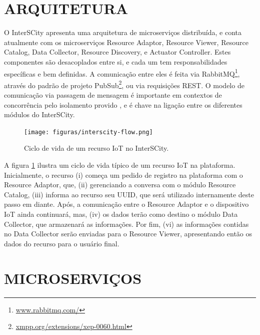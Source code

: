 \section{ARQUITETURA}

O InterSCity apresenta uma arquitetura de microserviços distribuída, e conta
atualmente com os microserviços Resource Adaptor, Resource Viewer,
Resource Catalog, Data Collector, Resource Discovery, e Actuator Controller.
Estes componentes são desacoplados entre si, e cada um tem
responsabilidades específicas e bem definidas. A comunicação entre eles é
feita via RabbitMQ\footnote{\url{www.rabbitmq.com/}}, através
do padrão de projeto PubSub\footnote{\url{xmpp.org/extensions/xep-0060.html}},
ou via requisições REST. O modelo de comunicação via passagem de mensagem é
importante em contextos de concorrência pelo isolamento provido
\cite{armstrong2003}, e é chave na ligação entre os diferentes módulos do
InterSCity.

\begin{figure}
  \centering
    \texttt{[image: figuras/interscity-flow.png]}
  \caption{Ciclo de vida de um recurso IoT no InterSCity.}
  \label{fig:interscity-lifecycle}
\end{figure}

A figura \ref{fig:interscity-lifecycle} ilustra um ciclo de vida típico de um
recurso IoT na plataforma. Inicialmente, o recurso (i) começa um pedido de
registro na plataforma com o Resource Adaptor, que, (ii) gerenciando a conversa
com o módulo Resource Catalog, (iii) informa ao recurso seu UUID, que será
utilizado internamente deste passo em diante. Após, a comunicação entre o
Resource Adaptor e o dispositivo IoT ainda continuará, mas, (iv) os dados terão
como destino o módulo Data Collector, que armazenará as informações. Por fim,
(vi) as informações contidas no Data Collector serão enviadas para o
Resource Viewer, apresentando então os dados do recurso para o usuário final.

\section{MICROSERVIÇOS}

